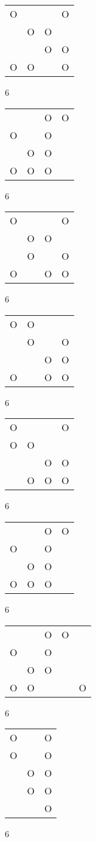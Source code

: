 \begin{tabular}{|m{0.2cm}m{0.2cm}m{0.2cm}m{0.2cm}|}\hline
O& & &O\\
 &O&O& \\
 & &O&O\\
O&O& &O\\
\hline\end{tabular}6
\begin{tabular}{|m{0.2cm}m{0.2cm}m{0.2cm}m{0.2cm}|}\hline
 & &O&O\\
O& &O& \\
 &O&O& \\
O&O&O& \\
\hline\end{tabular}6
\begin{tabular}{|m{0.2cm}m{0.2cm}m{0.2cm}m{0.2cm}|}\hline
O& & &O\\
 &O&O& \\
 &O& &O\\
O& &O&O\\
\hline\end{tabular}6
\begin{tabular}{|m{0.2cm}m{0.2cm}m{0.2cm}m{0.2cm}|}\hline
O&O& & \\
 &O& &O\\
 & &O&O\\
O& &O&O\\
\hline\end{tabular}6
\begin{tabular}{|m{0.2cm}m{0.2cm}m{0.2cm}m{0.2cm}|}\hline
O& & &O\\
O&O& & \\
 & &O&O\\
 &O&O&O\\
\hline\end{tabular}6
\begin{tabular}{|m{0.2cm}m{0.2cm}m{0.2cm}m{0.2cm}|}\hline
 & &O&O\\
O& &O& \\
 &O&O& \\
O&O&O& \\
\hline\end{tabular}6
\begin{tabular}{|m{0.2cm}m{0.2cm}m{0.2cm}m{0.2cm}m{0.2cm}|}\hline
 & &O&O& \\
O& &O& & \\
 &O&O& & \\
O&O& & &O\\
\hline\end{tabular}6
\begin{tabular}{|m{0.2cm}m{0.2cm}m{0.2cm}|}\hline
O& &O\\
O& &O\\
 &O&O\\
 &O&O\\
 & &O\\
\hline\end{tabular}6
